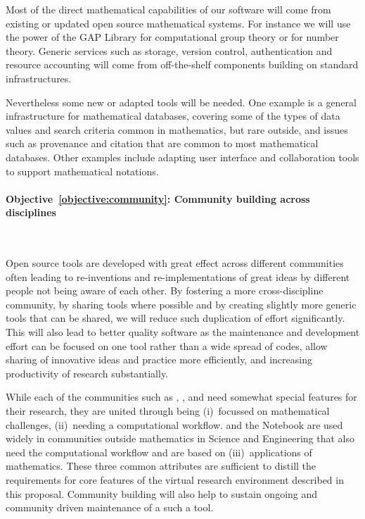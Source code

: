 \documentclass[noworkareas,deliverables,keys]{euproposal}                  %
\begin{document}
\begin{proposal}
Most of the direct mathematical capabilities of our software will come
from existing or updated open source mathematical systems. For instance we will
use the power of the GAP Library for computational group theory or
\PariGP for number theory. Generic services such as storage, version
control, authentication and resource accounting will come from
off-the-shelf components building on standard infrastructures. 

Nevertheless some new or adapted tools will be needed. One example is
a general infrastructure for mathematical databases, covering some of
the types of data values and search criteria common in mathematics,
but rare outside, and issues such as provenance and citation that are
common to most mathematical databases. Other examples include adapting
user interface and collaboration tools to support mathematical notations.




\paragraph{Objective~\ref{objective:community}: Community building across disciplines}\ 


Open source tools are developed with great effect across different
communities often leading to re-inventions and re-implementations of
great ideas by different people not being aware of each other. By
fostering a more cross-discipline community, by sharing tools where
possible and by creating slightly more generic tools that can be shared,
we will reduce such duplication of effort significantly. This will
also lead to better quality software as the maintenance and
development effort can be focused on one tool rather than a wide
spread of codes, allow sharing of innovative ideas and practice more
efficiently, and increasing productivity of research substantially.

While each of the communities such as \Sage, \Singular, and \GAP need
somewhat special features for their research, they are united through
being (i)~focussed on mathematical challenges, (ii)~needing a
computational workflow. \IPython and the \Jupyter Notebook are used
widely in communities outside mathematics in Science and Engineering
that also need the computational workflow and are based on
(iii)~applications of mathematics. These three common attributes are
sufficient to distill the requirements for core features of the
virtual research environment described in this \TheProject{}
proposal. Community building will also help to sustain ongoing and
community driven maintenance of a such a tool.




\end{proposal}
\end{document}
